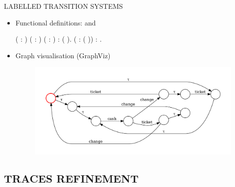 \documentclass[t]{beamer}
\begin{document}
\begin{frame}{LABELLED TRANSITION SYSTEMS}
	\begin{itemize}
		\item Functional definitions:  and \\
		\begin{coqdoccode}
			\small
			\coqdocnoindent
			 \coqdoceol
			\coqdocindent{1.00em}
			( : ) ( : ) ( : ) :  ( ).\coqdoceol
			\coqdocemptyline
			\coqdocnoindent
			  ( :  ( )) : .\coqdoceol
		\end{coqdoccode}

		\item Graph visualisation (GraphViz)
		\begin{figure}
			\includegraphics[scale=0.35]{figures/MACHINE_LTS.pdf}
		\end{figure}
	\end{itemize}
\end{frame}

\subsection{TRACES REFINEMENT}
\end{document}
